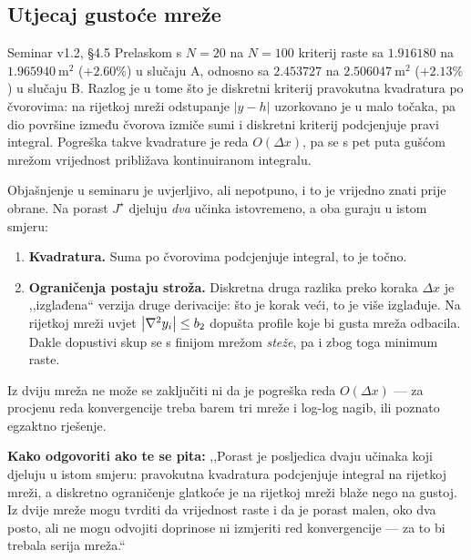 \subsection{Utjecaj gustoće mreže}

\begin{seminar}{Seminar v1.2, §4.5}
Prelaskom s $N = 20$ na $N = 100$ kriterij raste sa $1.916180$ na
$1.965940\ \mathrm{m}^2$ ($+2.60\%$) u slučaju A, odnosno sa $2.453727$ na
$2.506047\ \mathrm{m}^2$ ($+2.13\%$) u slučaju B. Razlog je u tome što je diskretni
kriterij pravokutna kvadratura po čvorovima: na rijetkoj mreži odstupanje
$|y - h|$ uzorkovano je u malo točaka, pa dio površine između čvorova izmiče sumi
i diskretni kriterij podcjenjuje pravi integral. Pogreška takve kvadrature je
reda $O(\Delta x)$, pa se s pet puta gušćom mrežom vrijednost približava
kontinuiranom integralu.
\end{seminar}

\begin{zamka}
Objašnjenje u seminaru je uvjerljivo, ali nepotpuno, i to je vrijedno znati prije
obrane. Na porast $J^{\star}$ djeluju \emph{dva} učinka istovremeno, a oba guraju
u istom smjeru:
\begin{enumerate}[leftmargin=*]
  \item \textbf{Kvadratura.} Suma po čvorovima podcjenjuje integral, to je točno.
  \item \textbf{Ograničenja postaju stroža.} Diskretna druga razlika preko
        koraka $\Delta x$ je ,,izglađena`` verzija druge derivacije: što je korak
        veći, to je više izglađuje. Na rijetkoj mreži uvjet
        $\left\lvert \nabla^2 y_i \right\rvert \leq b_2$ dopušta profile koje bi gusta mreža
        odbacila. Dakle dopustivi skup se s finijom mrežom \emph{steže}, pa i
        zbog toga minimum raste.
\end{enumerate}
Iz dviju mreža ne može se zaključiti ni da je pogreška reda $O(\Delta x)$ --- za
procjenu reda konvergencije treba barem tri mreže i log-log nagib, ili poznato
egzaktno rješenje.

\textbf{Kako odgovoriti ako te se pita:} ,,Porast je posljedica dvaju učinaka
koji djeluju u istom smjeru: pravokutna kvadratura podcjenjuje integral na
rijetkoj mreži, a diskretno ograničenje glatkoće je na rijetkoj mreži blaže nego
na gustoj. Iz dvije mreže mogu tvrditi da vrijednost raste i da je porast malen,
oko dva posto, ali ne mogu odvojiti doprinose ni izmjeriti red konvergencije ---
za to bi trebala serija mreža.``
\end{zamka}

